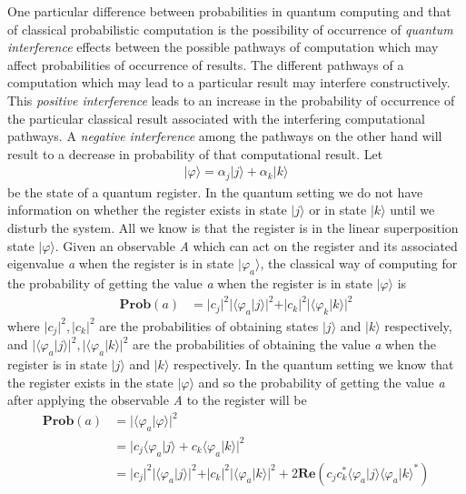 One particular difference between probabilities in quantum computing and that of classical probabilistic computation is the possibility of occurrence of \textit{quantum interference} effects between the possible pathways of computation which may affect probabilities of occurrence of results. The different pathways of a computation which may lead to a particular result may interfere constructively. This \textit{positive interference} leads to an increase in the probability of occurrence of the particular classical result associated with the interfering computational pathways. A \textit{negative interference} among the pathways on the other hand will result to a decrease in probability of that computational result. Let 
\begin{align}
\vert \varphi \rangle = \alpha_j\vert j \rangle + \alpha_k\vert k \rangle
\end{align} 
be the state of a quantum register. In the quantum setting we do not have information on whether the register exists in state $\vert j \rangle$ or in state $\vert k \rangle$ until we disturb the system. All we know is that the register is in the linear superposition state $\vert \varphi \rangle$. Given an observable \textit{A} which can act on the register and its associated eigenvalue \textit{a} when the register is in state $\vert \varphi_{a} \rangle$, the classical way of computing for the probability of getting the value \textit{a} when the register is in state $\vert \varphi \rangle$ is
\begin{align}
	\textbf{Prob}(a) &= \vert c_j \vert^2 \vert \langle \varphi_a \vert j \rangle \vert^2 + \vert c_k \vert^2 \vert \langle \varphi_k \vert k \rangle \vert^2
\end{align}
where $\vert c_j \vert^2, \vert c_k \vert^2$ are the probabilities of obtaining states $\vert j \rangle$ and $\vert k \rangle$ respectively, and $\vert \langle \varphi_{a} \vert j \rangle \vert^{2}, \vert \langle \varphi_{a} \vert k \rangle \vert^{2}$ are the probabilities of obtaining the value \textit{a} when the register is in state $\vert j \rangle$ and $\vert k \rangle$ respectively. In the quantum setting we know that the register exists in the state $\vert \varphi \rangle$ and so the probability of getting the value \textit{a} after applying the observable \textit{A} to the register will be
\begin{equation*}
	\begin{split}
	\textbf{Prob}(a) &= \vert \langle \varphi_a \vert \varphi \rangle \vert^2\\
	&= \vert c_j \langle \varphi_a \vert j \rangle + c_k \langle \varphi_a \vert k \rangle \vert^2\\
	&= \vert c_j \vert^2 \vert \langle {\varphi}_a \vert j \rangle \vert^2 + \vert c_k \vert^2 \vert \langle \varphi_a \vert k \rangle \vert^2 + 2\textbf{Re}(c_j c_k^{*} \langle \varphi_a \vert j \rangle \langle \varphi_a \vert k \rangle^{*})
	\end{split}
\end{equation*}
